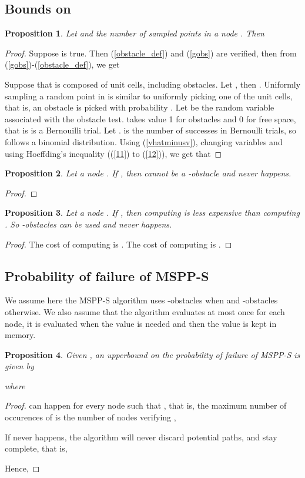 \documentclass[letterpaper, 10 pt, conference]{ieeeconf}
\newtheorem{prop}{Proposition}
\theoremstyle{definition}
\begin{document}
\subsection{Bounds on }
\begin{prop}
Let  and  the number of sampled points in a node . Then

\end{prop}
\begin{proof}
Suppose  is true. Then (\ref{obstacle_def}) and (\ref{gobs}) are verified, then from (\ref{gobs})-(\ref{obstacle_def}), we get  

Suppose that  is composed of  unit cells, including  obstacles. Let , then 
.
Uniformly sampling a random point in  is similar to uniformly picking one of the  unit cells, that is, an obstacle is picked with probability . Let  be the random variable associated with the  obstacle test.  takes value 1 for obstacles and 0 for free space, that is  is a Bernouilli trial. Let .  is the number of successes in  Bernoulli trials, so  follows a binomial distribution. Using (\ref{vhatminusv}), changing variables and using Hoeffding's inequality ((\ref{11}) to (\ref{12})), we get that

\end{proof}
\begin{prop}
Let a node .
If , then  cannot be a -obstacle and  never happens.
\end{prop}
\begin{proof}

\end{proof}
\begin{prop}
Let a node .
If , then computing  is less expensive than computing . So -obstacles can be used and  never happens.
\end{prop}
\begin{proof}
The cost of computing  is . The cost of computing  is .

\end{proof}

\subsection{Probability of failure of MSPP-S}
We assume here the MSPP-S algorithm uses -obstacles when  and -obstacles otherwise.
We also assume that the algorithm evaluates  at most once for each node, it is evaluated when the value is needed and then the value is kept in memory.
\begin{prop}
Given , an upperbound on the probability of failure of MSPP-S is given by

where

\end{prop}
\begin{proof}
 can happen for every node such that , that is, the maximum number of occurences  of  is the number of nodes verifying ,

If  never happens, the algorithm will never discard potential paths, and stay complete, that is,

Hence,

\end{proof}
\end{document}
